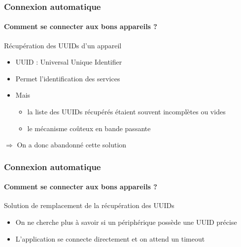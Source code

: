\documentclass{beamer}
\begin{document}
    \begin{frame}
      \frametitle{Connexion automatique}
      \framesubtitle{Comment se connecter aux bons appareils ?}
      \begin{block}{Récupération des UUIDs d'un appareil}
        \begin{itemize}
          \item UUID : Universal Unique Identifier
          \item Permet l'identification des services
          \item Mais
          \begin{itemize}
            \item la liste des UUIDs récupérés étaient souvent incomplètes ou vides
            \item le mécanisme coûteux en bande passante
          \end{itemize}
        \end{itemize}
        \begin{center}
          $ \Rightarrow $ On a donc abandonné cette solution
        \end{center}
      \end{block}
    \end{frame}
    \begin{frame}
      \frametitle{Connexion automatique}
      \framesubtitle{Comment se connecter aux bons appareils ?}
      \begin{block}{Solution de remplacement de la récupération des UUIDs}
        \begin{itemize}
          \item On ne cherche plus à savoir si un périphérique possède une UUID précise
          \item L'application se connecte directement et on attend un timeout
        \end{itemize}
      \end{block}
    \end{frame}
\end{document}

